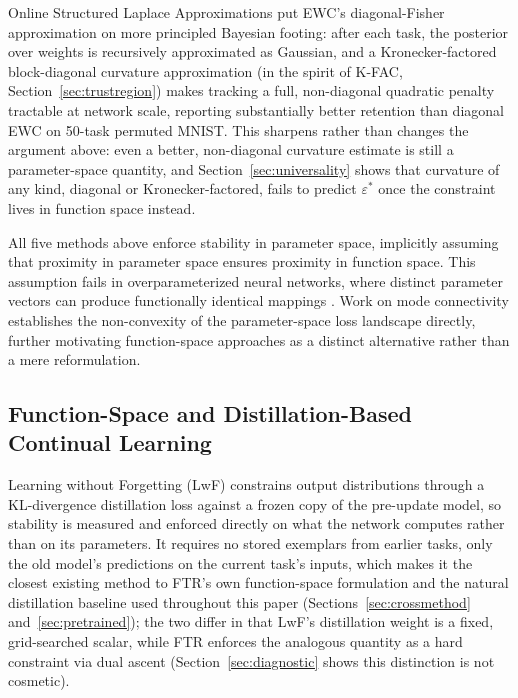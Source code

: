 \documentclass[11pt]{article}
\newcommand{\eps}{\varepsilon}
\newcommand{\epsstar}{\eps^{*}}
\begin{document}
Online Structured Laplace Approximations \citep{ritter2018online} put EWC's
diagonal-Fisher approximation on more principled Bayesian footing: after
each task, the posterior over weights is recursively approximated as
Gaussian, and a Kronecker-factored block-diagonal curvature approximation
(in the spirit of K-FAC, Section~\ref{sec:trustregion}) makes tracking a
full, non-diagonal quadratic penalty tractable at network scale, reporting
substantially better retention than diagonal EWC on 50-task permuted MNIST.
This sharpens rather than changes the argument above: even a better,
non-diagonal curvature estimate is still a parameter-space quantity, and
Section~\ref{sec:universality} shows that curvature of any kind, diagonal
or Kronecker-factored, fails to predict $\epsstar$ once the constraint
lives in function space instead.

All five methods above enforce stability in parameter space, implicitly
assuming that proximity in parameter space ensures proximity in function
space. This assumption fails in overparameterized neural networks, where
distinct parameter vectors can produce functionally identical mappings
\citep{garipov2018loss,frankle2020linear,frankle2018lottery}. Work on mode
connectivity \citep{garipov2018loss,draxler2018essentially} establishes the
non-convexity of the parameter-space loss landscape directly, further
motivating function-space approaches as a distinct alternative rather than
a mere reformulation.

\subsection{Function-Space and Distillation-Based Continual Learning}
\label{sec:functionspace}
Learning without Forgetting (LwF) \citep{li2017learning} constrains output
distributions through a KL-divergence distillation loss against a frozen
copy of the pre-update model, so stability is measured and enforced
directly on what the network computes rather than on its parameters. It
requires no stored exemplars from earlier tasks, only the old model's
predictions on the current task's inputs, which makes it the closest
existing method to FTR's own function-space formulation and the natural
distillation baseline used throughout this paper
(Sections~\ref{sec:crossmethod} and~\ref{sec:pretrained}); the two differ in
that LwF's distillation weight is a fixed, grid-searched scalar, while FTR
enforces the analogous quantity as a hard constraint via dual ascent
(Section~\ref{sec:diagnostic} shows this distinction is not cosmetic).
\end{document}
